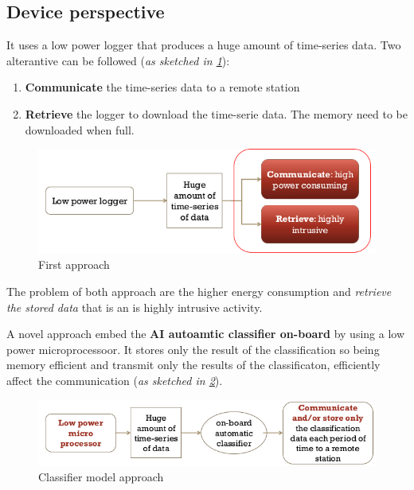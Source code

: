 \documentclass[10pt,a4paper]{report}
\theoremstyle{definition}
\begin{document}
\subsection{Device perspective}\label{sec:device-perspective}
It uses a low power logger that produces a huge amount of time-series data. Two alterantive can be followed (\textit{as sketched in \ref{approach-1-animal}}):
\begin{enumerate}
	\item 
	\textbf{Communicate} the time-series data to a remote station
	\item 
	\textbf{Retrieve} the logger to download the time-serie data. The memory need to be downloaded when full.
\end{enumerate}

\begin{figure}[h]
	\centering\includegraphics[scale=0.50]{images/Pasted image 20230401153838.png}
	\caption{First approach}
	\label{approach-1-animal}
\end{figure}

The problem of both approach are the higher energy consumption and \textit{retrieve the stored data} that is an is highly intrusive activity.


A novel approach embed the \textbf{AI autoamtic classifier on-board} by using a low power microprocessoor. It stores only the result of the classification so being memory efficient and transmit only the results of the classificaton, efficiently affect the communication (\textit{as sketched in \ref{approach-2-animal}}).
\begin{figure}[h!]
	\centering\includegraphics[scale=0.50]{images/Pasted image 20230401153826.png}
	\caption{Classifier model approach}
	\label{approach-2-animal}
\end{figure}
\end{document}
